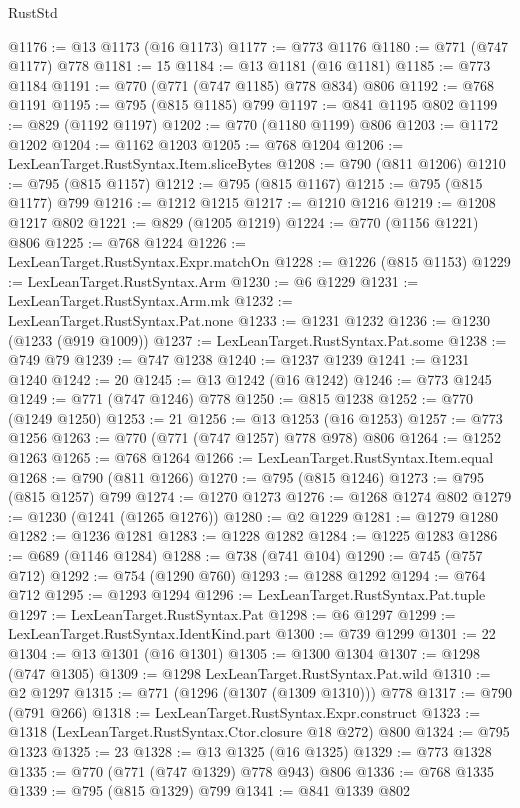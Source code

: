 \begin{lexlean}{RustStd}
\begin{coremodule}
@1176 := @13 @1173 (@16 @1173)
@1177 := @773 @1176
@1180 := @771 (@747 @1177) @778
@1181 := 15
@1184 := @13 @1181 (@16 @1181)
@1185 := @773 @1184
@1191 := @770 (@771 (@747 @1185) @778 @834) @806
@1192 := @768 @1191
@1195 := @795 (@815 @1185) @799
@1197 := @841 @1195 @802
@1199 := @829 (@1192 @1197)
@1202 := @770 (@1180 @1199) @806
@1203 := @1172 @1202
@1204 := @1162 @1203
@1205 := @768 @1204
@1206 := LexLeanTarget.RustSyntax.Item.sliceBytes
@1208 := @790 (@811 @1206)
@1210 := @795 (@815 @1157)
@1212 := @795 (@815 @1167)
@1215 := @795 (@815 @1177) @799
@1216 := @1212 @1215
@1217 := @1210 @1216
@1219 := @1208 @1217 @802
@1221 := @829 (@1205 @1219)
@1224 := @770 (@1156 @1221) @806
@1225 := @768 @1224
@1226 := LexLeanTarget.RustSyntax.Expr.matchOn
@1228 := @1226 (@815 @1153)
@1229 := LexLeanTarget.RustSyntax.Arm
@1230 := @6 @1229
@1231 := LexLeanTarget.RustSyntax.Arm.mk
@1232 := LexLeanTarget.RustSyntax.Pat.none
@1233 := @1231 @1232
@1236 := @1230 (@1233 (@919 @1009))
@1237 := LexLeanTarget.RustSyntax.Pat.some
@1238 := @749 @79
@1239 := @747 @1238
@1240 := @1237 @1239
@1241 := @1231 @1240
@1242 := 20
@1245 := @13 @1242 (@16 @1242)
@1246 := @773 @1245
@1249 := @771 (@747 @1246) @778
@1250 := @815 @1238
@1252 := @770 (@1249 @1250)
@1253 := 21
@1256 := @13 @1253 (@16 @1253)
@1257 := @773 @1256
@1263 := @770 (@771 (@747 @1257) @778 @978) @806
@1264 := @1252 @1263
@1265 := @768 @1264
@1266 := LexLeanTarget.RustSyntax.Item.equal
@1268 := @790 (@811 @1266)
@1270 := @795 (@815 @1246)
@1273 := @795 (@815 @1257) @799
@1274 := @1270 @1273
@1276 := @1268 @1274 @802
@1279 := @1230 (@1241 (@1265 @1276))
@1280 := @2 @1229
@1281 := @1279 @1280
@1282 := @1236 @1281
@1283 := @1228 @1282
@1284 := @1225 @1283
@1286 := @689 (@1146 @1284)
@1288 := @738 (@741 @104)
@1290 := @745 (@757 @712)
@1292 := @754 (@1290 @760)
@1293 := @1288 @1292
@1294 := @764 @712
@1295 := @1293 @1294
@1296 := LexLeanTarget.RustSyntax.Pat.tuple
@1297 := LexLeanTarget.RustSyntax.Pat
@1298 := @6 @1297
@1299 := LexLeanTarget.RustSyntax.IdentKind.part
@1300 := @739 @1299
@1301 := 22
@1304 := @13 @1301 (@16 @1301)
@1305 := @1300 @1304
@1307 := @1298 (@747 @1305)
@1309 := @1298 LexLeanTarget.RustSyntax.Pat.wild
@1310 := @2 @1297
@1315 := @771 (@1296 (@1307 (@1309 @1310))) @778
@1317 := @790 (@791 @266)
@1318 := LexLeanTarget.RustSyntax.Expr.construct
@1323 := @1318 (LexLeanTarget.RustSyntax.Ctor.closure @18 @272) @800
@1324 := @795 @1323
@1325 := 23
@1328 := @13 @1325 (@16 @1325)
@1329 := @773 @1328
@1335 := @770 (@771 (@747 @1329) @778 @943) @806
@1336 := @768 @1335
@1339 := @795 (@815 @1329) @799
@1341 := @841 @1339 @802

\end{coremodule}
\end{lexlean}
